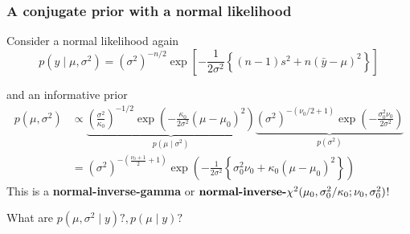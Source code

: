\documentclass{beamer}
\begin{document}



 





\begin{frame}[fragile]
\frametitle{A conjugate prior with a normal likelihood}

Consider a normal likelihood again
\[
p(y \mid \mu, \sigma^2) = (\sigma^2)^{-n/2} \exp\left[ - \frac{1}{2\sigma^2}\left\{(n-1)  s^2 + n(\bar{y} - \mu)^2 \right\} \right]
\]

and an informative prior 
\begin{align*}
p(\mu, \sigma^2) &\propto \underbrace{\left(\frac{\sigma^2}{\kappa_0}\right)^{-1/2}\exp\left(-\frac{\kappa_0}{2 \sigma^2}(\mu - \mu_0)^2 \right)}_{p(\mu \mid \sigma^2)} \underbrace{(\sigma^2)^{-(\nu_0/2 + 1)} \exp\left(-\frac{\sigma^2_0 \nu_0}{2 \sigma^2} \right) }_{p(\sigma^2)} \\
&= (\sigma^2)^{-(\frac{\nu_0+1}{2} + 1)} \exp\left(-\frac{1}{2 \sigma^2}\left\{ \sigma^2_0 \nu_0 + \kappa_0(\mu - \mu_0)^2\right\} \right) 
\end{align*}
This is a {\bf normal-inverse-gamma} or $\mbox{{\bf
  normal-inverse-}}\chi^2(\mu_0, \sigma_0^2/\kappa_0; \nu_0, \sigma_0^2)$!

What are $p(\mu, \sigma^2 \mid y) ?, p(\mu \mid y) ?$

\end{frame}
\end{document}

